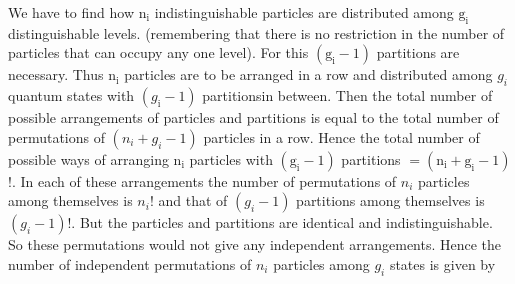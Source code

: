  We have to find how $\mathrm{n}_{\mathrm{i}}$ indistinguishable particles are distributed among $\mathrm{g}_{\mathrm{i}}$ distinguishable levels. (remembering that there is no restriction in the number of particles that can occupy any one level). For this $\left(\mathrm{g}_{\mathrm{i}}-1\right)$ partitions are necessary. Thus $\mathrm{n}_{\mathrm{i}}$ particles are to be arranged in a row and distributed among $g_{i}$ quantum states with $\left(g_{\mathrm{i}}-1\right)$ partitionsin between. Then the total number of possible arrangements of particles and partitions is equal to the total number of permutations of $\left(n_{i}+g_{i}-1\right)$ particles in a row. Hence the total number of possible ways of arranging $\mathrm{n}_{\mathrm{i}}$ particles with $\left(\mathrm{g}_{\mathrm{i}}-1\right)$ partitions $=\left(\mathrm{n}_{\mathrm{i}}+\mathrm{g}_{\mathrm{i}}-1\right)$ !. In each of these arrangements the number of permutations of $n_{i}$ particles among themselves is $n_{i} !$ and that of $\left(g_{i}-1\right)$ partitions among themselves is $\left(g_{i}-1\right) !$. But the particles and partitions are identical and indistinguishable. So these permutations would not give any independent arrangements. Hence the number of independent permutations of $n_{i}$ particles among $g_{i}$ states is given by
